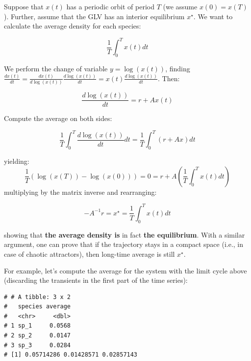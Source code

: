 \documentclass[]{book}
\newenvironment{Shaded}{\begin{snugshade}}{\end{snugshade}}
\newcommand{\CommentTok}[1]{\textcolor[rgb]{0.56,0.35,0.01}{\textit{#1}}}
\newcommand{\DataTypeTok}[1]{\textcolor[rgb]{0.13,0.29,0.53}{#1}}
\newcommand{\DecValTok}[1]{\textcolor[rgb]{0.00,0.00,0.81}{#1}}
\newcommand{\KeywordTok}[1]{\textcolor[rgb]{0.13,0.29,0.53}{\textbf{#1}}}
\newcommand{\NormalTok}[1]{#1}
\newcommand{\OperatorTok}[1]{\textcolor[rgb]{0.81,0.36,0.00}{\textbf{#1}}}
\newcommand{\StringTok}[1]{\textcolor[rgb]{0.31,0.60,0.02}{#1}}
\begin{document}
Suppose that \(x(t)\) has a periodic orbit of period \(T\) (we assume \(x(0) = x(T)\)). Further, assume that the GLV has an interior equilibrium \(x^\star\). We want to calculate the average density for each species:

\[
\frac{1}{T} \int_0^T x(t) dt
\]

We perform the change of variable \(y = \log(x(t))\), finding \(\frac{d x(t)}{dt} = \frac{d x(t)}{d \log(x(t))}\frac{d \log(x(t))}{dt} = x(t)\frac{d \log(x(t))}{dt}\). Then:

\[
\frac{d \log(x(t))}{dt} = r + Ax(t)
\]

Compute the average on both sides:

\[
\frac{1}{T}\int_0^T \frac{d \log(x(t))}{dt} dt= \frac{1}{T}\int_0^T \left(r + Ax \right) dt
\]

yielding:
\[
\frac{1}{T}(\log(x(T)) - \log(x(0))) = 0 = r + A \left( \frac{1}{T} \int_0^T x(t) dt \right)
\]
multiplying by the matrix inverse and rearranging:

\[
-A^{-1} r = x^\star =  \frac{1}{T} \int_0^T x(t) dt 
\]

showing that \textbf{the average density is} in fact \textbf{the equilibrium}. With a similar argument, one can prove that if the trajectory stays in a compact space (i.e., in case of chaotic attractors), then long-time average is still \(x^\star\).

For example, let's compute the average for the system with the limit cycle above (discarding the transients in the first part of the time series):

\begin{Shaded}
\end{Shaded}

\begin{verbatim}
# # A tibble: 3 x 2
#   species average
#   <chr>     <dbl>
# 1 sp_1     0.0568
# 2 sp_2     0.0147
# 3 sp_3     0.0284
# [1] 0.05714286 0.01428571 0.02857143
\end{verbatim}
\end{document}
